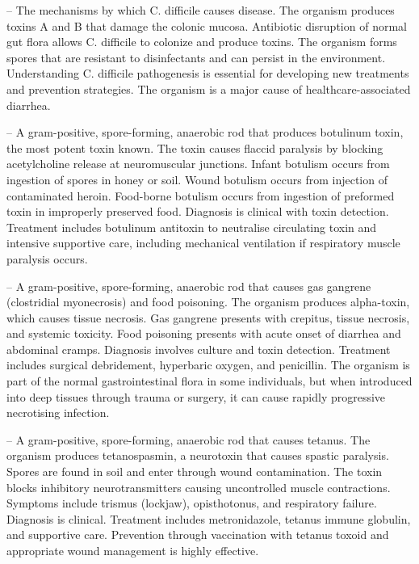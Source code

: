 -- The mechanisms by which C. difficile causes disease. The organism produces toxins A and B that damage the colonic mucosa. Antibiotic disruption of normal gut flora allows C. difficile to colonize and produce toxins. The organism forms spores that are resistant to disinfectants and can persist in the environment. Understanding C. difficile pathogenesis is essential for developing new treatments and prevention strategies. The organism is a major cause of healthcare-associated diarrhea.

-- A gram-positive, spore-forming, anaerobic rod that produces botulinum toxin, the most potent toxin known. The toxin causes flaccid paralysis by blocking acetylcholine release at neuromuscular junctions. Infant botulism occurs from ingestion of spores in honey or soil. Wound botulism occurs from injection of contaminated heroin. Food-borne botulism occurs from ingestion of preformed toxin in improperly preserved food. Diagnosis is clinical with toxin detection. Treatment includes botulinum antitoxin to neutralise circulating toxin and intensive supportive care, including mechanical ventilation if respiratory muscle paralysis occurs.

-- A gram-positive, spore-forming, anaerobic rod that causes gas gangrene (clostridial myonecrosis) and food poisoning. The organism produces alpha-toxin, which causes tissue necrosis. Gas gangrene presents with crepitus, tissue necrosis, and systemic toxicity. Food poisoning presents with acute onset of diarrhea and abdominal cramps. Diagnosis involves culture and toxin detection. Treatment includes surgical debridement, hyperbaric oxygen, and penicillin. The organism is part of the normal gastrointestinal flora in some individuals, but when introduced into deep tissues through trauma or surgery, it can cause rapidly progressive necrotising infection.

-- A gram-positive, spore-forming, anaerobic rod that causes tetanus. The organism produces tetanospasmin, a neurotoxin that causes spastic paralysis. Spores are found in soil and enter through wound contamination. The toxin blocks inhibitory neurotransmitters causing uncontrolled muscle contractions. Symptoms include trismus (lockjaw), opisthotonus, and respiratory failure. Diagnosis is clinical. Treatment includes metronidazole, tetanus immune globulin, and supportive care. Prevention through vaccination with tetanus toxoid and appropriate wound management is highly effective.

